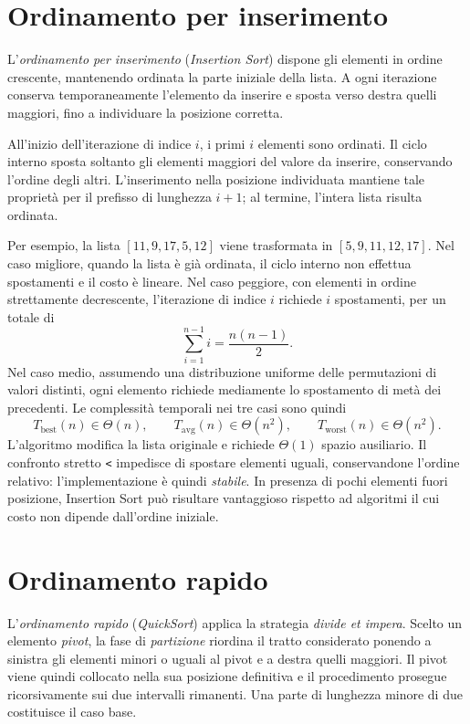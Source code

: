 \section{Ordinamento per inserimento}
\label{sec:fi-ordinamento-inserimento}

L'\emph{ordinamento per inserimento} (\emph{Insertion Sort}) dispone
gli elementi in ordine crescente, mantenendo ordinata la parte
iniziale della lista. A ogni iterazione conserva temporaneamente
l'elemento da inserire e sposta verso destra quelli maggiori,
fino a individuare la posizione corretta.



All'inizio dell'iterazione di indice \(i\), i primi \(i\) elementi
sono ordinati. Il ciclo interno sposta soltanto gli elementi maggiori
del valore da inserire, conservando l'ordine degli altri.
L'inserimento nella posizione individuata mantiene tale proprietà
per il prefisso di lunghezza \(i+1\); al termine, l'intera lista
risulta ordinata.

Per esempio, la lista \([11,9,17,5,12]\) viene trasformata in
\([5,9,11,12,17]\). Nel caso migliore, quando la lista è già ordinata,
il ciclo interno non effettua spostamenti e il costo è lineare.
Nel caso peggiore, con elementi in ordine strettamente decrescente,
l'iterazione di indice \(i\) richiede \(i\) spostamenti, per un totale di
\[
  \sum_{i=1}^{n-1}i=\frac{n(n-1)}2.
\]
Nel caso medio, assumendo una distribuzione uniforme delle
permutazioni di valori distinti, ogni elemento richiede mediamente
lo spostamento di metà dei precedenti. Le complessità temporali
nei tre casi sono quindi
\[
  T_{\mathrm{best}}(n)\in\Theta(n),\qquad
  T_{\mathrm{avg}}(n)\in\Theta(n^2),\qquad
  T_{\mathrm{worst}}(n)\in\Theta(n^2).
\]
L'algoritmo modifica la lista originale e richiede \(\Theta(1)\)
spazio ausiliario. Il confronto stretto \lstinline|<| impedisce
di spostare elementi uguali, conservandone l'ordine relativo:
l'implementazione è quindi \emph{stabile}. In presenza di pochi
elementi fuori posizione, Insertion Sort può risultare vantaggioso
rispetto ad algoritmi il cui costo non dipende dall'ordine iniziale.

\section{Ordinamento rapido}
\label{sec:fi-ordinamento-rapido}

L'\emph{ordinamento rapido} (\emph{QuickSort}) applica la strategia
\emph{divide et impera}. Scelto un elemento \emph{pivot}, la fase di
\emph{partizione} riordina il tratto considerato ponendo a sinistra
gli elementi minori o uguali al pivot e a destra quelli maggiori.
Il pivot viene quindi collocato nella sua posizione definitiva e
il procedimento prosegue ricorsivamente sui due intervalli rimanenti.
Una parte di lunghezza minore di due costituisce il caso base.

